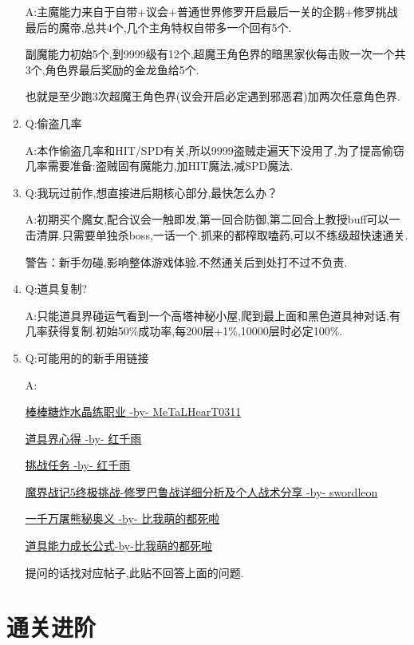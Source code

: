 \begin{enumerate}
	A:主魔能力来自于自带+议会+普通世界修罗开启最后一关的企鹅+修罗挑战最后的魔帝,总共4个,几个主角特权自带多一个回有5个.
	
	副魔能力初始5个,到9999级有12个,超魔王角色界的暗黑家伙每击败一次一个共3个,角色界最后奖励的金龙鱼给5个.

	也就是至少跑3次超魔王角色界(议会开启必定遇到邪恶君)加两次任意角色界.

	\item
	Q:偷盗几率

	A:本作偷盗几率和HIT/SPD有关,所以9999盗贼走遍天下没用了,为了提高偷窃几率需要准备:盗贼固有魔能力,加HIT魔法,减SPD魔法.

	\item
	Q:我玩过前作,想直接进后期核心部分,最快怎么办？

	A:初期买个魔女,配合议会一触即发,第一回合防御,第二回合上教授buff可以一击清屏.只需要单独杀boss,一话一个.抓来的都榨取嗑药,可以不练级超快速通关.

	警告：新手勿碰,影响整体游戏体验.不然通关后到处打不过不负责.

	\item
	Q:道具复制?

	A:只能道具界碰运气看到一个高塔神秘小屋,爬到最上面和黑色道具神对话,有几率获得复制.初始50\%成功率,每200层+1\%,10000层时必定100\%.


	\item
	Q:可能用的的新手用链接

	A:

	\href{http://tieba.baidu.com/p/3717431968}{棒棒糖炸水晶练职业 -by- MeTaLHearT0311}

	\href{http://tieba.baidu.com/p/3730196003}{道具界心得 -by- 红千雨}

	\href{http://tieba.baidu.com/p/3723862919}{挑战任务 -by- 红千雨}

	\href{http://tieba.baidu.com/p/3949061316}{魔界战记5终极挑战-修罗巴鲁战详细分析及个人战术分享 -by- swordleon}

	\href{http://tieba.baidu.com/p/3825275063}{一千万屠熊秘奥义 -by- 比我萌的都死啦}

	\href{http://tieba.baidu.com/f?kz=3834692385}{道具能力成长公式-by-比我萌的都死啦}

	提问的话找对应帖子,此贴不回答上面的问题.

\end{enumerate}


\newpage

\section{通关进阶}

